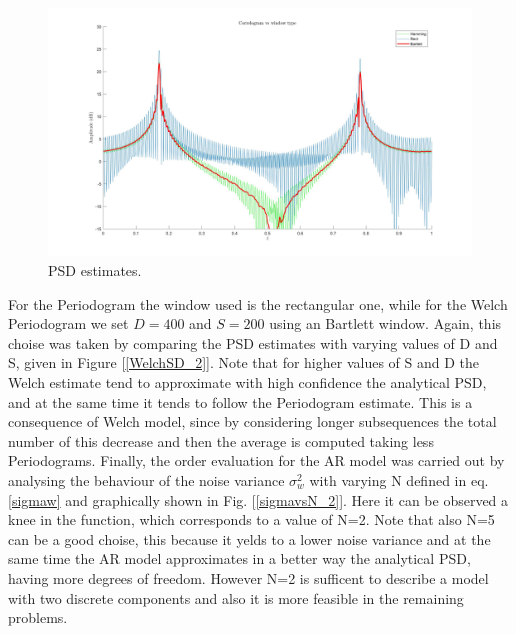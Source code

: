 \documentclass[a4paper,11pt,openright,twoside]{report}
\begin{document}
\begin{figure}
	\centering
	\includegraphics[width=14cm]{images/Corr_vs_window.jpg}
	\caption{PSD estimates.}\label{Welch_2} 
\end{figure}

For the Periodogram the window used is the rectangular one, while for the Welch Periodogram we set $D=400$ and $S=200$ using an Bartlett window. Again, this choise was taken by comparing the PSD estimates with varying values of D and S, given in Figure [\ref{WelchSD_2}]. Note that for higher values of S and D the Welch estimate tend to approximate with high confidence the analytical PSD, and at the same time it tends to follow the Periodogram estimate. This is a consequence of Welch model, since by considering longer subsequences the total number of this decrease and then the average is computed taking less Periodograms. Finally, the order evaluation for the AR model was carried out by analysing the behaviour of the noise variance $\sigma_w^2$ with varying N defined in eq. \ref{sigmaw} and graphically shown in Fig. [\ref{sigmavsN_2}]. Here it can be observed a knee in the function, which corresponds to a value of N=2. Note that also N=5 can be a good choise, this because it yelds to a lower noise variance and at the same time the AR model approximates in a better way the analytical PSD, having more degrees of freedom. However N=2 is sufficent to describe a model with two discrete components and also it is more feasible in the remaining problems.
\end{document}
